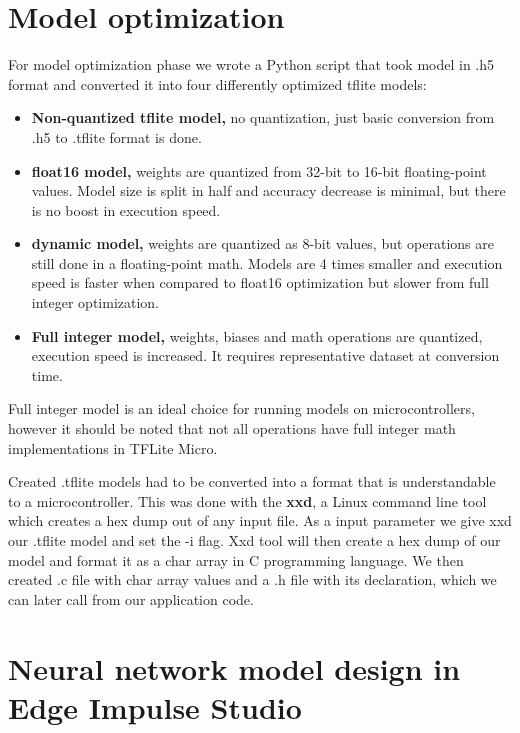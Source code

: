 \section{ Model optimization}

For model optimization phase we wrote a Python script that took model in .h5 format and converted it into four differently optimized tflite models:
\begin{itemize}
    \item \textbf{Non-quantized tflite model,} no quantization, just basic conversion from .h5 to .tflite format is done.
    \item \textbf{float16 model,} weights are quantized from 32-bit to 16-bit floating-point values. Model size is split in half and accuracy decrease is minimal, but there is no boost in execution speed.
    \item \textbf{dynamic model,} weights are quantized as 8-bit values, but operations are still done in a floating-point math. Models are 4 times smaller and execution speed is faster when compared to float16 optimization but slower from full integer optimization.
    \item \textbf{Full integer model,} weights, biases and math operations are quantized, execution speed is increased. It requires representative dataset at conversion time.
\end{itemize}

Full integer model is an ideal choice for running models on microcontrollers, however it should be noted that not all operations have full integer math implementations in TFLite Micro.

Created .tflite models had to be converted into a format that is understandable to a microcontroller.
This was done with the \textbf{xxd}, a Linux command line tool which creates a hex dump out of any input file.
As a input parameter we give xxd our .tflite model and set the -i flag.
Xxd tool will then create a hex dump of our model and format it as a char array in C programming language. 
We then created .c file with char array values and a .h file with its declaration, which we can later call from our application code.


\section{ Neural network model design in Edge Impulse Studio}
